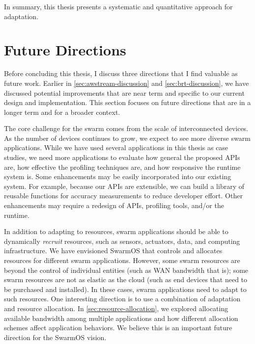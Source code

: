 \documentclass[thesis.tex]{subfiles}
\begin{document}
In summary, this thesis presents a systematic and quantitative approach for
adaptation.

\section{Future Directions}
\label{sec:future-directions}

Before concluding this thesis, I discuss three directions that I find valuable
as future work. Earlier in \autoref{sec:awstream-discussion} and
\autoref{sec:brt-discussion}, we have discussed potential improvements that are
near term and specific to our current design and implementation. This section
focuses on future directions that are in a longer term and for a broader
context.

 The core challenge for the
swarm comes from the scale of interconnected devices. As the number of devices
continues to grow, we expect to see more diverse swarm applications. While we
have used several applications in this thesis as case studies, we need more
applications to evaluate how general the proposed APIs are, how effective the
profiling techniques are, and how responsive the runtime system is. Some
enhancements may be easily incorporated into our existing system. For example,
because our APIs are extensible, we can build a library of reusable functions
for accuracy measurements to reduce developer effort. Other enhancements may
require a redesign of APIs, profiling tools, and/or the runtime.

 In addition to adapting to resources,
swarm applications should be able to dynamically \emph{recruit} resources, such
as sensors, actuators, data, and computing infrastructure. We have envisioned
SwarmOS that controls and allocates resources for different swarm
applications. However, some swarm resources are beyond the control of individual
entities (such as WAN bandwidth that is); some swarm resources are not as
elastic as the cloud (such as end devices that need to be purchased and
installed). In these cases, swarm applications need to adapt to such
resources. One interesting direction is to use a combination of adaptation and
resource allocation. In \autoref{sec:resource-allocation}, we explored
allocating available bandwidth among multiple applications and how different
allocation schemes affect application behaviors. We believe this is an important
future direction for the SwarmOS vision.
\end{document}

